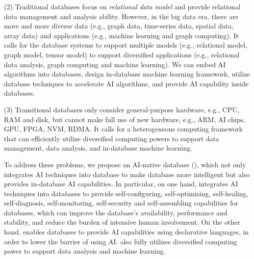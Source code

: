 

(2) Traditional databases focus on {\it relational data model} and provide relational data management and analysis ability. However, in the big data era, there are more and more diverse data (e.g., graph data, time-series data, spatial data, array data) and applications (e.g., machine learning and graph computing). It calls for the database systems to support multiple models (e.g., relational model, graph model, tensor model) to support diversified applications (e.g., relational data analysis, graph computing and machine learning). We can embed AI algorithms into databases, design in-database machine learning framework, utilize database techniques to accelerate AI algorithms, and provide AI capability inside databases.


(3) Transitional databases only consider general-purpose hardware, e.g., CPU, RAM and disk, but cannot make full use of new hardware, e.g., ARM, AI chips, GPU, FPGA, NVM, RDMA. It calls for a heterogeneous computing framework that can efficiently utilize diversified computing powers to support data management, data analysis, and in-database machine learning. 



To address these problems, we propose an AI-native database (\oursys), which not only integrates AI techniques into database to make database more intelligent but also provides in-database AI capabilities. In particular, on one hand, \oursys integrates AI techniques into databases to provide self-configuring, self-optimizing, self-healing, self-diagnosis, self-monitoring, self-security and self-assembling capabilities for databases, which can improve the database's availability, performance and stability, and reduce the burden of intensive human involvement. On the other hand, \oursys enables databases to provide AI capabilities using declarative languages, in order to lower the barrier of using AI. \oursys also fully utilizes diversified computing power to support data analysis and machine learning. 


